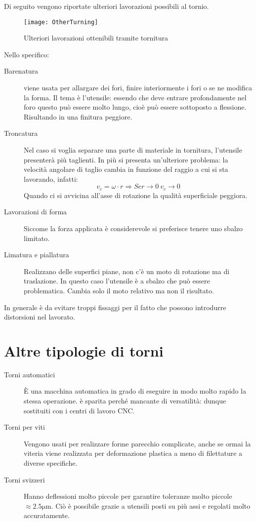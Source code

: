 Di seguito vengono riportate ulteriori lavorazioni possibili al tornio.

\begin{figure}
\centering
\texttt{[image: OtherTurning]}
\caption{Ulteriori lavorazioni ottenibili tramite tornitura}
\label{fig:OtherTurning}
\end{figure}

Nello specifico:
\begin{description}
\item[Barenatura] viene usata per allargare dei fori, finire interiormente i fori o se ne modifica la forma.
Il tema è l'utensile: essendo che deve entrare profondamente nel foro questo può essere molto lungo, cioè può essere sottoposto a flessione. Risultando in una finitura peggiore.
\item[Troncatura] Nel caso si voglia separare una parte di materiale in tornitura, l'utensile presenterà più taglienti.
In più si presenta un'ulteriore problema: la velocità angolare di taglio cambia in funzione del raggio a cui si sta lavorando, infatti:
\begin{equation}
v_c = \omega \cdot r \Rightarrow Se r \rightarrow 0 \: v_c \rightarrow 0
\end{equation}
Quando ci si avvicina all'asse di rotazione la qualità superficiale peggiora.
\item[Lavorazioni di forma] Siccome la forza applicata è considerevole si preferisce tenere uno sbalzo limitato.
\item[Limatura e piallatura] Realizzano delle superfici piane, non c'è un moto di rotazione ma di traslazione. In questo caso l'utensile è a sbalzo che può essere problematica.
Cambia solo il moto relativo ma non il risultato.
\end{description}

In generale è da evitare troppi fissaggi per il fatto che possono introdurre distorsioni nel lavorato.

\section{Altre tipologie di torni}
\begin{description}
\item[Torni automatici] È una macchina automatica in grado di eseguire in modo molto rapido la stessa operazione. è sparita perché mancante di versatilità: dunque sostituiti con i centri di lavoro \ac{CNC}.
\item[Torni per viti] Vengono usati per realizzare forme parecchio complicate, anche se ormai la viteria viene realizzata per deformazione plastica a meno di filettature a diverse specifiche.
\item[Torni svizzeri] Hanno deflessioni molto piccole per garantire toleranze molto piccole $\approx 2.5\unit{\um}$. Ciò è possibile grazie a utensili posti su più assi e regolati molto accuratamente.
\end{description}

